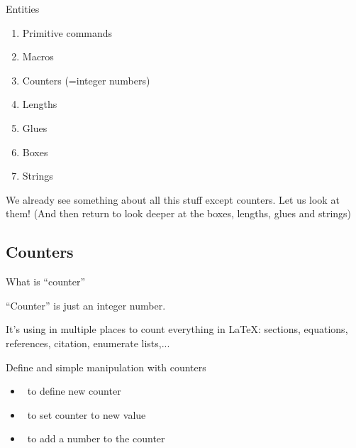 \graphicspath{{sec04/images/}{sec04/code/}}
\lstset{inputpath=sec04/code/}

\begin{frame}{Entities}

\begin{enumerate}
    \item Primitive commands
    \item Macros
    \item Counters (=integer numbers)
    \item Lengths
    \item Glues
    \item Boxes
    \item Strings
\end{enumerate}
\incPause
We already see something about all this stuff except counters. Let us look at them! (And then return to look deeper at the boxes, lengths, glues and strings)
     
\end{frame}

\subsection{Counters}
\begin{frame}{What is ``counter''}\relax

``Counter'' is just an integer number.

It's using in multiple places to count everything in \LaTeX: sections, equations, references, citation, enumerate lists,...
     
\end{frame}

\begin{frame}{Define and simple manipulation with counters \lW}\relax
{}

\begin{itemize}
    \item \ccol\newcounter\ to define new counter 
    \item \ccol\setcounter\ to set counter to new value
    \item \ccol\addtocounter\ to add a number to the counter
\end{itemize}

     
\end{frame}

